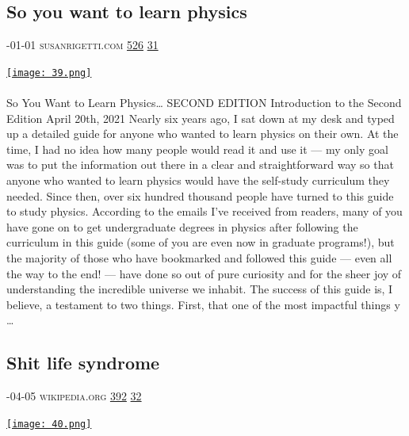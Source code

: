 \documentclass[10pt,a4paper]{article}
\begin{document}
\begin{multicols}{2}
\begin{minipage}{\linewidth}
\subsection{So you want to learn physics}
\textsc{\footnotesize
{\scriptsize\faCalendar}-01-01 
{\scriptsize\faGlobe}\space 
susanrigetti.com 
{\scriptsize\faThumbsOUp}\space 
\href{http://news.ycombinator.com/item?id=37200615\&utm\_term=comment}{526} 
{\scriptsize\faComments}\space 
\href{http://news.ycombinator.com/item?id=37200615\&utm\_term=comment}{31} 
}
\par\medskip\noindent
\href{https://www.susanrigetti.com/physics?utm\_source=hackernewsletter\&utm\_medium=email\&utm\_term=learn}{
    \texttt{[image: 39.png]}
}
\end{minipage}
\paragraph{}
So You Want to Learn Physics…
SECOND EDITION
Introduction to the Second Edition
April 20th, 2021
Nearly six years ago, I sat down at my desk and typed up a detailed guide for anyone who wanted to learn physics on their own. At the time, I had no idea how many people would read it and use it — my only goal was to put the information out there in a clear and straightforward way so that anyone who wanted to learn physics would have the self-study curriculum they needed. Since then, over six hundred thousand people have turned to this guide to study physics.
According to the emails I’ve received from readers, many of you have gone on to get undergraduate degrees in physics after following the curriculum in this guide (some of you are even now in graduate programs!), but the majority of those who have bookmarked and followed this guide — even all the way to the end! — have done so out of pure curiosity and for the sheer joy of understanding the incredible universe we inhabit.
The success of this guide is, I believe, a testament to two things.
First, that one of the most impactful things y
\dots\par
\noindent\begin{minipage}{\linewidth}
\medskip
\subsection{Shit life syndrome}
\textsc{\footnotesize
{\scriptsize\faCalendar}-04-05 
{\scriptsize\faGlobe}\space 
wikipedia.org 
{\scriptsize\faThumbsOUp}\space 
\href{http://news.ycombinator.com/item?id=37197155\&utm\_term=comment}{392} 
{\scriptsize\faComments}\space 
\href{http://news.ycombinator.com/item?id=37197155\&utm\_term=comment}{32} 
}
\par\medskip\noindent
\href{https://en.wikipedia.org/wiki/Shit\_life\_syndrome?utm\_source=hackernewsletter\&utm\_medium=email\&utm\_term=learn}{
    \texttt{[image: 40.png]}
}
\end{minipage}

\end{multicols}
\end{document}
